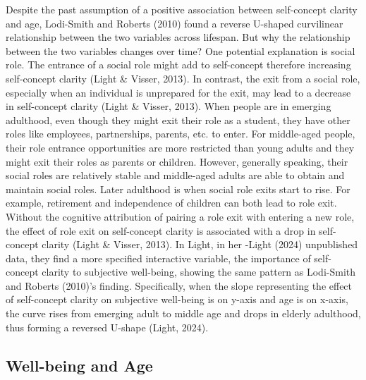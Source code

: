 \documentclass[
  man,floatsintext]{apa6}
\begin{document}
Despite the past assumption of a positive association between self-concept clarity and age, Lodi-Smith and Roberts (2010) found a reverse U-shaped curvilinear relationship between the two variables across lifespan. But why the relationship between the two variables changes over time?
One potential explanation is social role. The entrance of a social role might add to self-concept therefore increasing self-concept clarity (Light \& Visser, 2013). In contrast, the exit from a social role, especially when an individual is unprepared for the exit, may lead to a decrease in self-concept clarity (Light \& Visser, 2013). When people are in emerging adulthood, even though they might exit their role as a student, they have other roles like employees, partnerships, parents, etc. to enter. For middle-aged people, their role entrance opportunities are more restricted than young adults and they might exit their roles as parents or children. However, generally speaking, their social roles are relatively stable and middle-aged adults are able to obtain and maintain social roles. Later adulthood is when social role exits start to rise. For example, retirement and independence of children can both lead to role exit. Without the cognitive attribution of pairing a role exit with entering a new role, the effect of role exit on self-concept clarity is associated with a drop in self-concept clarity (Light \& Visser, 2013).
In Light, in her -Light (2024) unpublished data, they find a more specified interactive variable, the importance of self-concept clarity to subjective well-being, showing the same pattern as Lodi-Smith and Roberts (2010)'s finding. Specifically, when the slope representing the effect of self-concept clarity on subjective well-being is on y-axis and age is on x-axis, the curve rises from emerging adult to middle age and drops in elderly adulthood, thus forming a reversed U-shape (Light, 2024).

\hypertarget{well-being-and-age}{%
\subsection{Well-being and Age}\label{well-being-and-age}}
\end{document}
